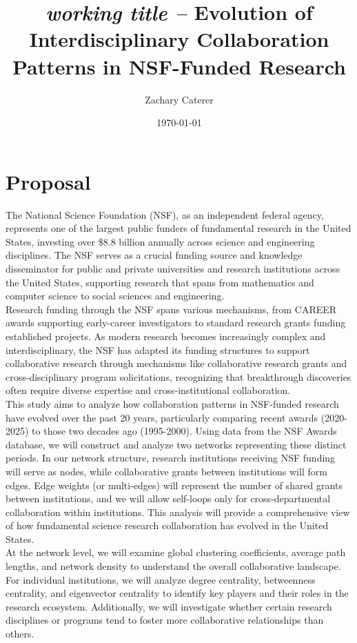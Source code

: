 \documentclass[10pt,twocolumn]{article}
\title{\textit{working title --} \textbf{Evolution of Interdisciplinary Collaboration Patterns in NSF-Funded Research}}
\author{
    Zachary Caterer%
}
\date{\today}
\begin{document}
\maketitle

\section*{Proposal}

The National Science Foundation (NSF), as an independent federal agency, represents one of the largest public funders of fundamental research in the United States, investing over 
\$8.8 billion annually across science and engineering disciplines. The NSF serves as a crucial funding source and knowledge disseminator for public and private universities and research 
institutions across the United States, supporting research that spans from mathematics and computer science to social sciences and engineering.\\

Research funding through the NSF spans various mechanisms, from CAREER awards supporting early-career investigators to standard research grants funding established projects. 
As modern research becomes increasingly complex and interdisciplinary, the NSF has adapted its funding structures to support collaborative research through mechanisms like collaborative 
research grants and cross-disciplinary program solicitations, recognizing that breakthrough discoveries often require diverse expertise and cross-institutional collaboration.\\

This study aims to analyze how collaboration patterns in NSF-funded research have evolved over the past 20 years, particularly comparing recent awards (2020-2025) to those two decades ago (1995-2000). 
Using data from the NSF Awards database, we will construct and analyze two networks representing these distinct periods. In our network structure, research institutions receiving NSF 
funding will serve as nodes, while collaborative grants between institutions will form edges. Edge weights (or multi-edges) will represent the number of shared grants between institutions, 
and we will allow self-loops only for cross-departmental collaboration within institutions. This analysis will provide a comprehensive view of how fundamental science research collaboration has 
evolved in the United States.\\

At the network level, we will examine global clustering coefficients, average path lengths, and network density to understand the overall collaborative landscape. 
For individual institutions, we will analyze degree centrality, betweenness centrality, and eigenvector centrality to identify key players and their roles in the research ecosystem. 
Additionally, we will investigate whether certain research disciplines or programs tend to foster more collaborative relationships than others.\\
\end{document}
